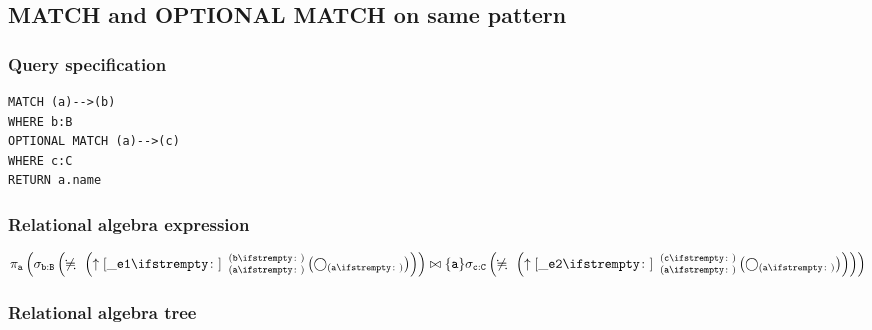 
\subsection{MATCH and OPTIONAL MATCH on same pattern}

\subsubsection*{Query specification}

\begin{lstlisting}
MATCH (a)-->(b)
WHERE b:B
OPTIONAL MATCH (a)-->(c)
WHERE c:C
RETURN a.name
\end{lstlisting}

\subsubsection*{Relational algebra expression}

$\projection{\var{a}} \left(\selection{\mathtt{b:B}} \left(\alldifferent{} \left(\expandout{\_e1}{}{a}{b}{} \left(\getvertices{a}{}\right)\right)\right) \join \{\var{a}\} \selection{\mathtt{c:C}} \left(\alldifferent{} \left(\expandout{\_e2}{}{a}{c}{} \left(\getvertices{a}{}\right)\right)\right)\right)$

\subsubsection*{Relational algebra tree}

